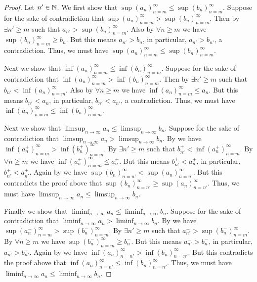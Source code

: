 \begin{proof}
  Let \(n' \in \mathbb{N}\).
  We first show that \(\sup(a_n)_{n = m}^\infty \leq \sup(b_n)_{n = m}^\infty\).
  Suppose for the sake of contradiction that \(\sup(a_n)_{n = m}^\infty > \sup(b_n)_{n = m}^\infty\).
  Then by  \(\exists n' \geq m\) such that \(a_{n'} > \sup(b_n)_{n = m}^\infty\).
  Also by  \(\forall n \geq m\) we have \(\sup(b_n)_{n = m}^\infty \geq b_n\).
  But this means \(a_{n'} > b_n\), in particular, \(a_{n'} > b_{n'}\), a contradiction.
  Thus, we must have \(\sup(a_n)_{n = m}^\infty \leq \sup(b_n)_{n = m}^\infty\).

  Next we show that \(\inf(a_n)_{n = m}^\infty \leq \inf(b_n)_{n = m}^\infty\).
  Suppose for the sake of contradiction that \(\inf(a_n)_{n = m}^\infty > \inf(b_n)_{n = m}^\infty\).
  Then by  \(\exists n' \geq m\) such that \(b_{n'} < \inf(a_n)_{n = m}^\infty\).
  Also by  \(\forall n \geq m\) we have \(\inf(a_n)_{n = m}^\infty \leq a_n\).
  But this means \(b_{n'} < a_n\), in particular, \(b_{n'} < a_{n'}\), a contradiction.
  Thus, we must have \(\inf(a_n)_{n = m}^\infty \leq \inf(b_n)_{n = m}^\infty\).

  Next we show that \(\limsup_{n \to \infty} a_n \leq \limsup_{n \to \infty} b_n\).
  Suppose for the sake of contradiction that \(\limsup_{n \to \infty} a_n > \limsup_{n \to \infty} b_n\).
  By  we have \(\inf(a_n^+)_{n = m}^\infty > \inf(b_n^+)_{n = m}^\infty\).
  By  \(\exists n' \geq m\) such that \(b_{n'}^+ < \inf(a_n^+)_{n = m}^\infty\).
  By  \(\forall n \geq m\) we have \(\inf(a_n^+)_{n = m}^\infty \leq a_n^+\).
  But this means \(b_{n'}^+ < a_n^+\), in particular, \(b_{n'}^+ < a_{n'}^+\).
  Again by  we have \(\sup(b_n)_{n = n'}^\infty < \sup(a_n)_{n = n'}^\infty\).
  But this contradicts the proof above that \(\sup(b_n)_{n = n'}^\infty \geq \sup(a_n)_{n = n'}^\infty\).
  Thus, we must have \(\limsup_{n \to \infty} a_n \leq \limsup_{n \to \infty} b_n\).

  Finally we show that \(\liminf_{n \to \infty} a_n \leq \liminf_{n \to \infty} b_n\).
  Suppose for the sake of contradiction that \(\liminf_{n \to \infty} a_n > \liminf_{n \to \infty} b_n\).
  By  we have \(\sup(a_n^-)_{n = m}^\infty > \sup(b_n^-)_{n = m}^\infty\).
  By  \(\exists n' \geq m\) such that \(a_{n'}^- > \sup(b_n^-)_{n = m}^\infty\).
  By  \(\forall n \geq m\) we have \(\sup(b_n^-)_{n = m}^\infty \geq b_n^-\).
  But this means \(a_{n'}^- > b_n^-\), in particular, \(a_{n'}^- > b_{n'}^-\).
  Again by  we have \(\inf(a_n)_{n = n'}^\infty > \inf(b_n)_{n = n'}^\infty\).
  But this contradicts the proof above that \(\inf(a_n)_{n = n'}^\infty \leq \inf(b_n)_{n = n'}^\infty\).
  Thus, we must have \(\liminf_{n \to \infty} a_n \leq \liminf_{n \to \infty} b_n\).
\end{proof}

